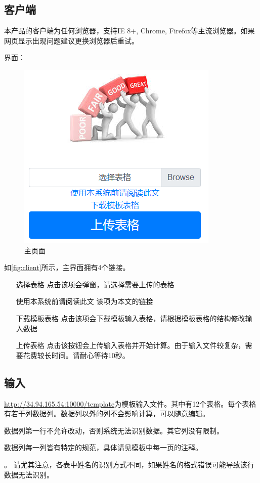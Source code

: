 \documentclass[UTF8,fontset=windowsnew]{ctexart}
\begin{document}
\subsection{客户端}
本产品的客户端为任何浏览器，支持IE 8+, Chrome, Firefox等主流浏览器。如果网页显示出现问题建议更换浏览器后重试。\par
界面：\par
\begin{figure}[h]
  \centering
  \includegraphics[width=.5\textwidth]{image/client.png}
  \caption{主页面}
  \label{fig:client}
\end{figure}
如\autoref{fig:client}所示，主界面拥有4个链接。\par
\begin{itemize}[font=\emph,leftmargin=1cm]
  \item [选择表格] 点击该项会弹窗，请选择需要上传的表格
  \item [使用本系统前请阅读此文] 该项为本文的链接
  \item [下载模板表格] 点击该项会下载模板输入表格，请根据模板表格的结构修改输入数据
  \item [上传表格] 点击该按钮会上传输入表格并开始计算。由于输入文件较复杂，需要花费较长时间。请耐心等待10秒。
\end{itemize}
\subsection{输入}
\url{http://34.94.165.54:10000/template}为模板输入文件。其中有12个表格。每个表格有若干列数据列。数据列以外的列不会影响计算，可以随意编辑。\par
数据列第一行不允许改动，否则系统无法识别数据。其它列没有限制。\par
数据列每一列皆有特定的规范，具体请见模板中每一页的注释。\par。
请尤其注意，各表中姓名的识别方式不同，如果姓名的格式错误可能导致该行数据无法识别。
\end{document}

